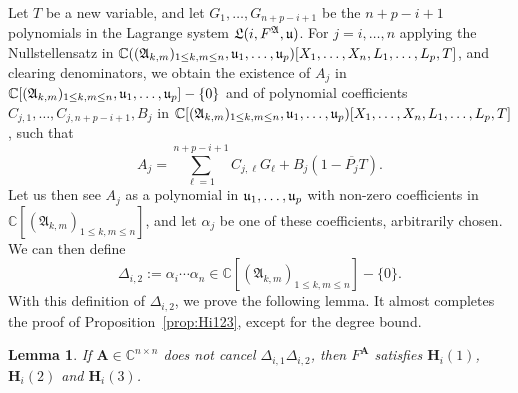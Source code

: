 \documentclass[12pt]{article}
\def\frkL{\mathfrak{L}}
\def\A{\mathfrak{A}}
\def\mA{{\bm A}}
\def\pjb{\overline{P_{j}}}
\def\D{\Delta}
\def\C{\mathbb{C}}
\newtheorem{lemma}[theorem]{Lemma}
\begin{document}
Let $T$ be a new variable, and let $G_1,\dots,G_{n+p-i+1}$ be the
$n+p-i+1$ polynomials in the Lagrange system ${\frkL}(i, F^\A, \frak
u)$.  For $j=i,\dots,n$ applying the
Nullstellensatz in $\C((\A_{k,m})_{1 \le k,m \le n},\frak
u_1,\dots,\frak u_p)[X_1,\dots,X_n,L_1,\dots,L_p,T]$, and clearing
denominators, we obtain the existence of $A_j$ in
$\C[(\A_{k,m})_{1 \le k,m \le n},\frak
u_1,\dots,\frak u_p]-\{0\}$ and of polynomial
coefficients $ C_{j,1},\dots,C_{j,n+p-i+1},B_j$ in $\C[(\A_{k,m})_{1
    \le k,m \le n},\frak
u_1,\dots,\frak u_p)[X_1,\dots,X_n,L_1,\dots,L_p,T]$, such that
\begin{equation}\label{eq:nullst}
A_j = \sum_{\ell=1}^{n+p-i+1} C_{j,\ell} G_\ell + B_j (1-\pjb T).
\end{equation}
Let us then see $A_j$ as a polynomial in $\frak u_1,\dots,\frak u_p$
with non-zero coefficients in $\C[(\A_{k,m})_{1 \le k,m \le n}]$, and let
$\alpha_j$ be one of these coefficients, arbitrarily chosen. We can then
define
\[\D_{i,2}:=\alpha_i \cdots \alpha_n \in \C[(\A_{k,m})_{1 \le k,m \le n}]-\{0\}.\]
With this definition of $\D_{i,2}$, we prove the following lemma.  It
almost completes the proof of Proposition~\ref{prop:Hi123}, except for
the degree bound.
\begin{lemma}\label{lem:6.4}
  If $\mA \in \C^{n\times n}$ does not cancel $\D_{i,1} \D_{i,2}$, then
  $F^{\mA}$ satisfies $\bm H_i(1)$, $\bm H_i(2)$ and $\bm H_i(3)$.
\end{lemma}
\end{document}
